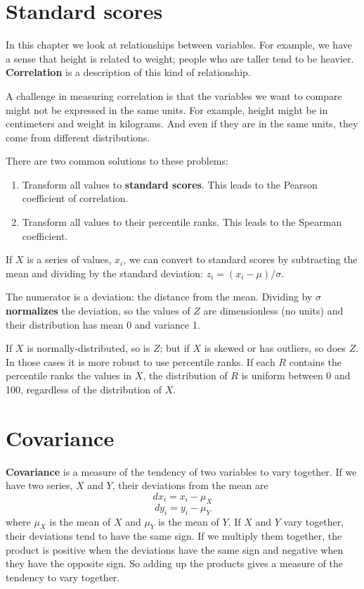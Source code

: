 \documentclass[12pt]{book}
\begin{document}
\section{Standard scores}

In this chapter we look at relationships between variables.  For
example, we have a sense that height is related to weight; people who
are taller tend to be heavier.  {\bf Correlation} is a description of
this kind of relationship.

A challenge in measuring correlation is that the variables we want
to compare might not be expressed in the same units.  For example, height
might be in centimeters and weight in kilograms.  And even if they are
in the same units, they come from different distributions.

There are two common solutions to these problems:

\begin{enumerate}

\item Transform all values to {\bf standard scores}.  This leads to
the Pearson coefficient of correlation.

\item Transform all values to their percentile ranks.  This
leads to the Spearman coefficient.

\end{enumerate}

If $X$ is a series of values, $x_i$, we can convert to standard
scores by subtracting the mean and dividing by the standard deviation:
$z_i = (x_i - \mu) / \sigma$.

The numerator is a deviation: the distance from the mean.  Dividing by
$\sigma$ {\bf normalizes} the deviation, so the values of $Z$ are
dimensionless (no units) and their distribution has mean 0 and
variance 1.

If $X$ is normally-distributed, so is $Z$; but if $X$ is skewed or has
outliers, so does $Z$.  In those cases it is more robust to use
percentile ranks.  If each $R$ contains the percentile ranks the
values in $X$, the distribution of $R$ is uniform between 0 and 100,
regardless of the distribution of $X$.


\section{Covariance}

{\bf Covariance} is a measure of the tendency of two variables
to vary together.  If we have two series, $X$ and $Y$, their
deviations from the mean are
%
\[ dx_i = x_i - \mu_X \]
%
\[ dy_i = y_i - \mu_Y \]
%
where $\mu_X$ is the mean of $X$ and $\mu_Y$ is the mean of $Y$.
If $X$ and $Y$ vary together, their deviations tend to have the same
sign.
If we multiply them together, the product is positive when the
deviations have the same sign and negative when they have the opposite
sign.  So adding up the products gives a measure of the tendency to
vary together.
\end{document}
